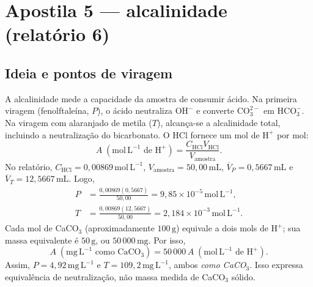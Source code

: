\documentclass[11pt,a4paper]{article}
\newcommand{\molL}{\mathrm{mol\,L^{-1}}}
\newcommand{\mgL}{\mathrm{mg\,L^{-1}}}
\newcommand{\mL}{\mathrm{mL}}
\begin{document}
\section{Apostila 5 --- alcalinidade (relatório 6)}
\subsection*{Ideia e pontos de viragem}
A alcalinidade mede a capacidade da amostra de consumir ácido. Na primeira viragem (fenolftaleína, $P$), o ácido neutraliza $\mathrm{OH^-}$ e converte $\mathrm{CO_3^{2-}}$ em $\mathrm{HCO_3^-}$. Na viragem com alaranjado de metila ($T$), alcança-se a alcalinidade total, incluindo a neutralização do bicarbonato. O HCl fornece um mol de $\mathrm{H^+}$ por mol:
\begin{equation}
A\;(\molL\text{ de }\mathrm{H^+})=\frac{C_{\mathrm{HCl}}V_{\mathrm{HCl}}}{V_{\mathrm{amostra}}}.
\end{equation}
No relatório, $C_{\mathrm{HCl}}=0{,}00869\,\molL$, $V_{\mathrm{amostra}}=50{,}00\,\mL$, $\overline V_P=0{,}5667\,\mL$ e $\overline V_T=12{,}5667\,\mL$. Logo,
\begin{align*}
P&=\frac{0{,}00869(0{,}5667)}{50{,}00}=9{,}85\times10^{-5}\,\molL,\\
T&=\frac{0{,}00869(12{,}5667)}{50{,}00}=2{,}184\times10^{-3}\,\molL.
\end{align*}
Cada mol de CaCO$_3$ (aproximadamente $100\,\mathrm{g}$) equivale a dois mols de $\mathrm{H^+}$; sua massa equivalente é $50\,\mathrm{g}$, ou $50\,000\,\mathrm{mg}$. Por isso,
\begin{equation}
A\;(\mgL\text{ como CaCO}_3)=50\,000\,A\;(\molL\text{ de }\mathrm{H^+}).
\end{equation}
Assim, $P=4{,}92\,\mgL$ e $T=109{,}2\,\mgL$, ambos \emph{como CaCO$_3$}. Isso expressa equivalência de neutralização, não massa medida de CaCO$_3$ sólido.
\end{document}
